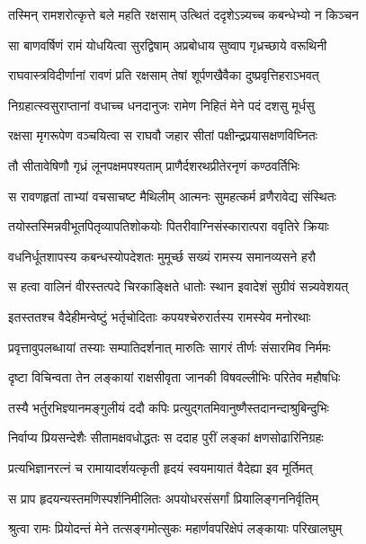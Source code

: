 \twolineshloka
{तस्मिन् रामशरोत्कृत्ते बले महति रक्षसाम्}
{उत्थितं ददृशेऽन्न्यच्च कबन्धेभ्यो न किञ्चन} %

\twolineshloka
{सा बाणवर्षिणं रामं योधयित्वा सुरद्विषाम्}
{अप्रबोधाय सुष्वाप गृध्रच्छाये वरूथिनी} %

\twolineshloka
{राघवास्त्रविदीर्णानां रावणं प्रति रक्षसाम्}
{तेषां शूर्पणखैवैका दुष्प्रवृत्तिहराऽभवत्} %

\twolineshloka
{निग्रहात्स्वसुराप्तानां वधाच्च धनदानुजः}
{रामेण निहितं मेने पदं दशसु मूर्धसु} %

\twolineshloka
{रक्षसा मृगरूपेण वञ्चयित्वा स राघवौ}
{जहार सीतां पक्षीन्द्रप्रयासक्षणविघ्नितः} %

\twolineshloka
{तौ सीतावेषिणौ गृध्रं लूनपक्षमपश्यताम्}
{प्राणैर्दशरथप्रीतेरनृणं कण्ठवर्तिभिः} %

\twolineshloka
{स रावणहृतां ताभ्यां वचसाचष्ट मैथिलीम्}
{आत्मनः सुमहत्कर्म व्रणैरावेद्य संस्थितः} %

\twolineshloka
{तयोस्तस्मिन्नवीभूतपितृव्यापतिशोकयोः}
{पितरीवाग्निसंस्कारात्परा ववृतिरे क्रियाः} %

\twolineshloka
{वधनिर्धूतशापस्य कबन्धस्योपदेशतः}
{मुमूर्च्छ सख्यं रामस्य समानव्यसने हरौ} %

\twolineshloka
{स हत्वा वालिनं वीरस्तत्पदे चिरकाङ्क्षिते}
{धातोः स्थान इवादेशं सुग्रीवं सन्न्यवेशयत्} %

\twolineshloka
{इतस्ततश्च वैदेहीमन्वेष्टुं भर्तृचोदिताः}
{कपयश्चेरुरार्तस्य रामस्येव मनोरथाः} %

\twolineshloka
{प्रवृत्तावुपलब्धायां तस्याः सम्पातिदर्शनात्}
{मारुतिः सागरं तीर्णः संसारमिव निर्ममः} %

\twolineshloka
{दृष्टा विचिन्वता तेन लङ्कायां राक्षसीवृता}
{जानकी विषवल्लीभिः परितेव महौषधिः} %

\twolineshloka
{तस्यै भर्तुरभिज्ञ्यानमङ्गुलीयं ददौ कपिः}
{प्रत्युद्गतमिवानुष्णैस्तदानन्दाश्रुबिन्दुभिः} %

\twolineshloka
{निर्वाप्य प्रियसन्देशैः सीतामक्षवधोद्धतः}
{स ददाह पुरीं लङ्कां क्षणसोढारिनिग्रहः} %

\twolineshloka
{प्रत्यभिज्ञानरत्नं च रामायादर्शयत्कृती}
{हृदयं स्वयमायातं वैदेह्या इव मूर्तिमत्} %

\twolineshloka
{स प्राप हृदयन्यस्तमणिस्पर्शनिमीलितः}
{अपयोधरसंसर्गां प्रियालिङ्गननिर्वृतिम्} %

\twolineshloka
{श्रुत्वा रामः प्रियोदन्तं मेने तत्सङ्गमोत्सुकः}
{महार्णवपरिक्षेपं लङ्कायाः परिखालघुम्} %

